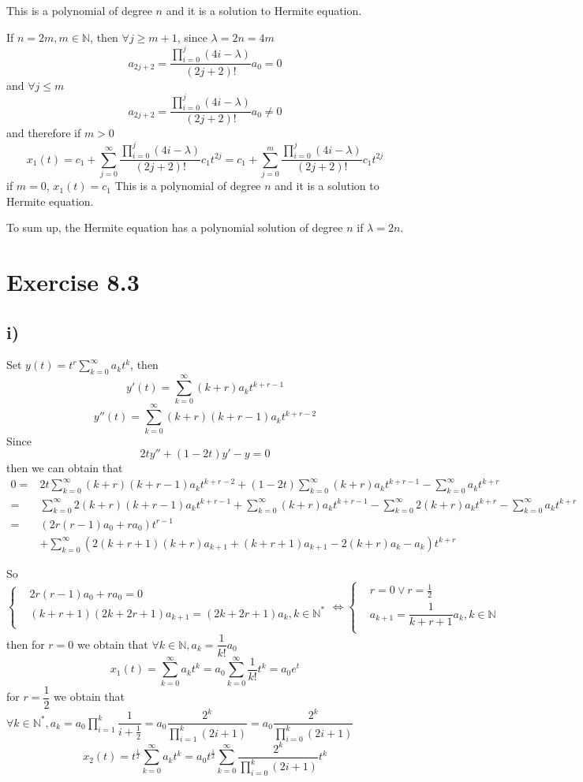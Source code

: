 \documentclass[a4paper,12pt,titlepage]{article}
\begin{document}
This is a polynomial of degree $n$ and it is a solution to Hermite equation.

If $n=2m,m\in\mathbb{N}$, then $\forall j\geqslant m+1$, since $\lambda=2n=4m$
$$a_{2j+2}=\dfrac{\prod\limits_{i=0}^j(4i-\lambda)}{(2j+2)!}a_0=0$$
and $\forall j\leqslant m$
$$a_{2j+2}=\dfrac{\prod\limits_{i=0}^j(4i-\lambda)}{(2j+2)!}a_0\neq0$$
and therefore if $m>0$
$$x_1(t)=c_1+\sum\limits_{j=0}^{\infty}\dfrac{\prod\limits_{i=0}^j(4i-\lambda)}{(2j+2)!}c_1t^{2j}=c_1+\sum\limits_{j=0}^{m}\dfrac{\prod\limits_{i=0}^j(4i-\lambda)}{(2j+2)!}c_1t^{2j}$$
if $m=0$, $x_1(t)=c_1$
This is a polynomial of degree $n$ and it is a solution to Hermite equation.

To sum up, the Hermite equation has a polynomial solution of degree $n$ if $\lambda = 2n$.
\section*{Exercise 8.3}
\subsection*{i)}
Set $y(t)=t^r\sum\limits_{k=0}^{\infty}a_kt^k$, then
$$y'(t)=\sum\limits_{k=0}^{\infty}(k+r)a_kt^{k+r-1}$$
$$y''(t)=\sum\limits_{k=0}^{\infty}(k+r)(k+r-1)a_kt^{k+r-2}$$
Since 
$$2ty''+(1-2t)y'-y=0$$
then we can obtain that
\begin{align*}
0=&2t\sum\limits_{k=0}^{\infty}(k+r)(k+r-1)a_{k}t^{k+r-2}+(1-2t)\sum\limits_{k=0}^{\infty}(k+r)a_kt^{k+r-1}-\sum\limits_{k=0}^{\infty}a_kt^{k+r}\\
=&\sum\limits_{k=0}^{\infty}2(k+r)(k+r-1)a_{k}t^{k+r-1}+\sum\limits_{k=0}^{\infty}(k+r)a_{k}t^{k+r-1}-\sum\limits_{k=0}^{\infty}2(k+r)a_k t^{k+r}-\sum\limits_{k=0}^{\infty}a_k t^{k+r}\\
=&(2r(r-1)a_0+ra_0)t^{r-1}\\
&+\sum\limits_{k=0}^{\infty}(2(k+r+1)(k+r)a_{k+1}+(k+r+1)a_{k+1}-2(k+r)a_k-a_k)t^{k+r}
\end{align*}

So
$$\left\{
\begin{aligned}
&2r(r-1)a_0+ra_0=0\\
&(k+r+1)(2k+2r+1)a_{k+1}=(2k+2r+1)a_k,k\in\mathbb{N}^*\\
\end{aligned}
\right.\Leftrightarrow \left\{
\begin{aligned}
&r=0\vee r=\frac{1}{2}\\
&a_{k+1}=\dfrac{1}{k+r+1}a_k,k\in\mathbb{N}\\
\end{aligned}
\right.$$
then for $r=0$ we obtain that $\forall k\in\mathbb{N}, a_k=\dfrac{1}{k!}a_0$
$$x_1(t)=\sum\limits_{k=0}^{\infty}a_kt^k=a_0\sum\limits_{k=0}^{\infty}\dfrac{1}{k!}t^k=a_0e^t$$
for $r=\dfrac{1}{2}$ we obtain that $\forall k\in\mathbb{N}^*, a_k=a_0\prod\limits_{i=1}^k\dfrac{1}{i+\frac{1}{2}}=a_0\dfrac{2^k}{\prod\limits_{i=1}^k(2i+1)}=a_0\dfrac{2^k}{\prod\limits_{i=0}^k(2i+1)}$
$$x_2(t)=t^{\frac{1}{2}}\sum\limits_{k=0}^{\infty}a_kt^k=a_0t^{\frac{1}{2}}\sum\limits_{k=0}^{\infty}\dfrac{2^k}{\prod\limits_{i=0}^k(2i+1)}t^k$$
\end{document}

